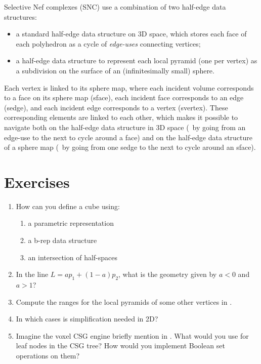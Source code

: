 Selective Nef complexes (SNC) use a combination of two half-edge data structures:

\begin{itemize}
\item a standard half-edge data structure on 3D space, which stores each face of each polyhedron as a cycle of \emph{edge-uses} connecting vertices;
\item a half-edge data structure to represent each local pyramid (one per vertex) as a subdivision on the surface of an (infinitesimally small) sphere.
\end{itemize}

Each vertex is linked to its sphere map, where each incident volume corresponds to a face on its sphere map (sface), each incident face corresponds to an edge (sedge), and each incident edge corresponds to a vertex (svertex).
These corresponding elements are linked to each other, which makes it possible to navigate both on the half-edge data structure in 3D space (\eg\ by going from an edge-use to the next to cycle around a face) and on the half-edge data structure of a sphere map (\eg\ by going from one sedge to the next to cycle around an sface).

%
\section{Exercises}

\begin{enumerate}
	\item How can you define a cube using:
	\begin{enumerate}
		\item a parametric representation
		\item a b-rep data structure
		\item an intersection of half-spaces
	\end{enumerate}
	\item In the line \(L = a p_1 + (1-a) p_2 \), what is the geometry given by \(a < 0\) and \(a > 1\)?
	\item Compute the ranges for the local pyramids of some other vertices in 
	.
	\item In which cases is simplification needed in 2D\@?
	\item Imagine the voxel CSG engine briefly mention in . What would you use for leaf nodes in the CSG tree? How would you implement Boolean set operations on them?
\end{enumerate}



